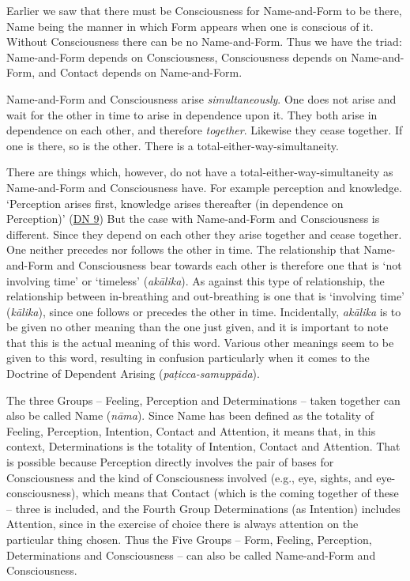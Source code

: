 Earlier we saw that there must be Consciousness for Name-and-Form to be there, Name being the manner in which Form appears when one is conscious of it. Without Consciousness there can be no Name-and-Form. Thus we have the triad: Name-and-Form depends on Consciousness, Consciousness depends on Name-and-Form, and Contact depends on Name-and-Form.

Name-and-Form and Consciousness arise \emph{simultaneously}. One does not arise and wait for the other in time to arise in dependence upon it. They both arise in dependence on each other, and therefore \emph{together}. Likewise they cease together. If one is there, so is the other. There is a total-either-way-simultaneity.

There are things which, however, do not have a total-either-way-simultaneity as Name-and-Form and Consciousness have. For example perception and knowledge. `Perception arises first, knowledge arises thereafter (in dependence on Perception)' (\href{https://suttacentral.net/dn9/en/thanissaro}{DN 9}) But the case with Name-and-Form and Consciousness is different. Since they depend on each other they arise together and cease together. One neither precedes nor follows the other in time. The relationship that Name-and-Form and Consciousness bear towards each other is therefore one that is `not involving time' or `timeless' (\textit{akālika}). As against this type of relationship, the relationship between in-breathing and out-breathing is one that is `involving time' (\textit{kālika}), since one follows or precedes the other in time. Incidentally, \textit{akālika} is to be given no other meaning than the one just given, and it is important to note that this is the actual meaning of this word. Various other meanings seem to be given to this word, resulting in confusion particularly when it comes to the Doctrine of Dependent Arising (\textit{paṭicca-samuppāda}).

The three Groups -- Feeling, Perception and Determinations -- taken together can also be called Name (\textit{nāma}). Since Name has been defined as the totality of Feeling, Perception, Intention, Contact and Attention, it means that, in this context, Determinations is the totality of Intention, Contact and Attention. That is possible because Perception directly involves the pair of bases for Consciousness and the kind of Consciousness involved (e.g., eye, sights, and eye-consciousness), which means that Contact (which is the coming together of these -- three is included, and the Fourth Group Determinations (as Intention) includes Attention, since in the exercise of choice there is always attention on the particular thing chosen. Thus the Five Groups -- Form, Feeling, Perception, Determinations and Consciousness -- can also be called Name-and-Form and Consciousness.
